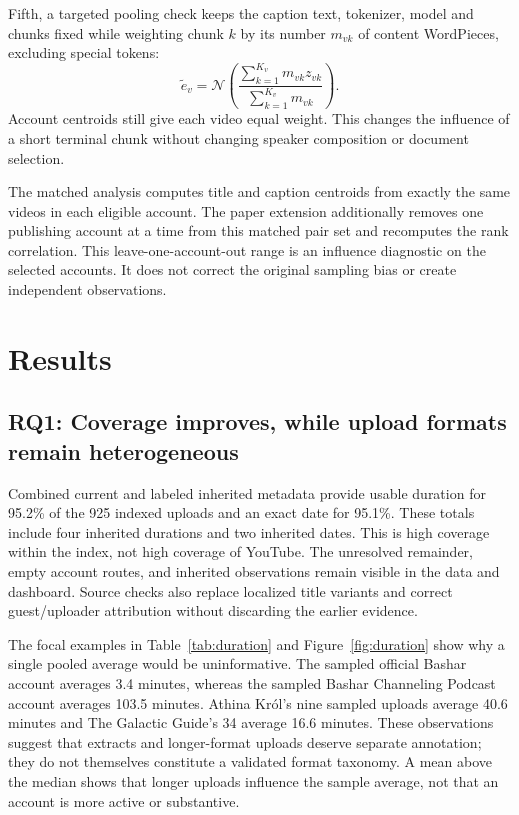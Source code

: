 Fifth, a targeted pooling check keeps the caption text, tokenizer, model and chunks fixed while weighting chunk $k$ by its number $m_{vk}$ of content WordPieces, excluding special tokens:
\begin{equation}
 \widetilde e_v=\mathcal{N}\!\left(\frac{\sum_{k=1}^{K_v}m_{vk}z_{vk}}{\sum_{k=1}^{K_v}m_{vk}}\right).
\end{equation}
Account centroids still give each video equal weight. This changes the influence of a short terminal chunk without changing speaker composition or document selection.

The matched analysis computes title and caption centroids from exactly the same videos in each eligible account. The paper extension additionally removes one publishing account at a time from this matched pair set and recomputes the rank correlation. This leave-one-account-out range is an influence diagnostic on the selected accounts. It does not correct the original sampling bias or create independent observations.

\section{Results}
\subsection{RQ1: Coverage improves, while upload formats remain heterogeneous}
Combined current and labeled inherited metadata provide usable duration for 95.2\% of the 925 indexed uploads and an exact date for 95.1\%. These totals include four inherited durations and two inherited dates. This is high coverage within the index, not high coverage of YouTube. The unresolved remainder, empty account routes, and inherited observations remain visible in the data and dashboard. Source checks also replace localized title variants and correct guest/uploader attribution without discarding the earlier evidence.

\begin{table}[t]
\centering

\caption{Selected publishing accounts emphasized in the research brief. Durations are minutes; $n/N$ is measured/indexed uploads. Means and medians describe these samples. Selection is illustrative, not a ranking. Full quartiles and all groups are in the released CSV.}
\label{tab:duration}
\end{table}

The focal examples in Table~\ref{tab:duration} and Figure~\ref{fig:duration} show why a single pooled average would be uninformative. The sampled official Bashar account averages 3.4 minutes, whereas the sampled Bashar Channeling Podcast account averages 103.5 minutes. Athina Kr\'ol's nine sampled uploads average 40.6 minutes and The Galactic Guide's 34 average 16.6 minutes. These observations suggest that extracts and longer-format uploads deserve separate annotation; they do not themselves constitute a validated format taxonomy. A mean above the median shows that longer uploads influence the sample average, not that an account is more active or substantive.

